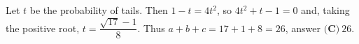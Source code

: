 Let $t$ be the probability of tails. Then $1-t=4t^2$, so $4t^2+t-1=0$ and, taking the positive root, $t=\dfrac{\sqrt{17}-1}8$. Thus $a+b+c=17+1+8=26$, answer $\boxed{\textbf{(C)}\ 26}$.

